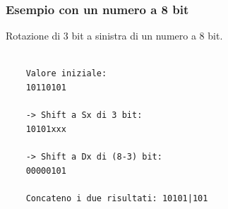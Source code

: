 \begin{frame}[fragile]
	\frametitle{Esempio con un numero a 8 bit}

	Rotazione di 3 bit a sinistra di un numero a 8 bit.

	\begin{verbatim}

	Valore iniziale:    		
	10110101

	-> Shift a Sx di 3 bit:
	10101xxx
	
	-> Shift a Dx di (8-3) bit:
	00000101

	Concateno i due risultati: 10101|101
	
	\end{verbatim}
\end{frame}